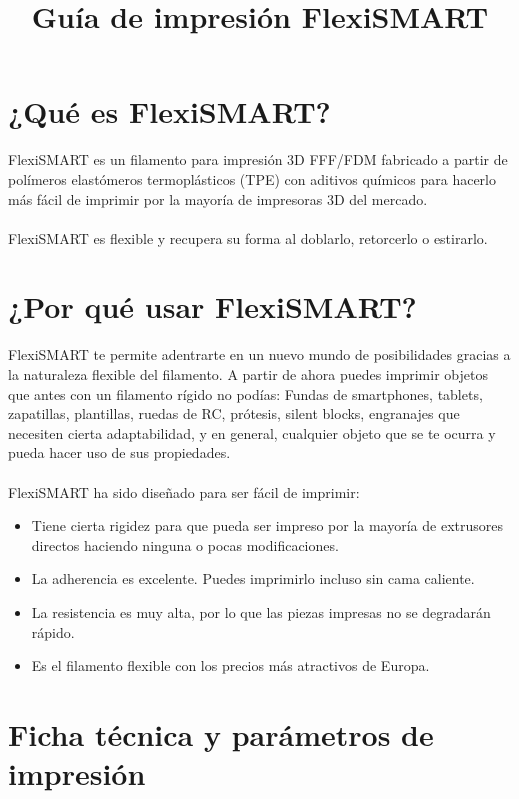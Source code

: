 \documentclass[11pt,a4paper]{article}
\title{Guía de impresión FlexiSMART}
\date{}
\begin{document}

\section{¿Qué es FlexiSMART?}FlexiSMART es un filamento para impresión 3D FFF/FDM fabricado a partir de polímeros elastómeros termoplásticos (TPE) con aditivos químicos para hacerlo más fácil de imprimir por la mayoría de impresoras 3D del mercado.
\\\\
FlexiSMART es flexible y recupera su forma al doblarlo, retorcerlo o estirarlo.

\section{¿Por qué usar FlexiSMART?}
FlexiSMART te permite adentrarte en un nuevo mundo de posibilidades gracias a la naturaleza flexible del filamento. A partir de ahora puedes imprimir objetos que antes con un filamento rígido no podías: Fundas de smartphones, tablets, zapatillas, plantillas, ruedas de RC, prótesis, silent blocks, engranajes que necesiten cierta adaptabilidad, y en general, cualquier objeto que se te ocurra y pueda hacer uso de sus propiedades.
\\\\
FlexiSMART ha sido diseñado para ser fácil de imprimir:
\begin{itemize}
\item Tiene cierta rigidez para que pueda ser impreso por la mayoría de extrusores directos haciendo ninguna o pocas modificaciones.
\item La adherencia es excelente. Puedes imprimirlo incluso sin cama caliente.
\item La resistencia es muy alta, por lo que las piezas impresas no se degradarán rápido.
\item Es el filamento flexible con los precios más atractivos de Europa.
\end{itemize}

\section{Ficha técnica y parámetros de impresión}
\end{document}
